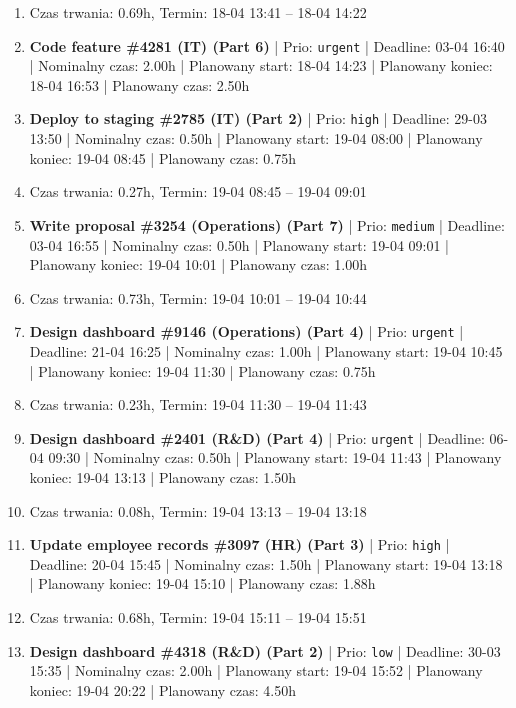 {\begin{enumerate}
  \item [\textbf{PRZERWA}] Czas trwania: 0.69h, Termin: 18-04 13:41 -- 18-04 14:22
  \item [\textbf{14604}] \textbf{Code feature \#4281 (IT) (Part 6)} | Prio: \texttt{urgent} | Deadline: 03-04 16:40 | Nominalny czas: 2.00h | Planowany start: 18-04 14:23 | Planowany koniec: 18-04 16:53 | Planowany czas: 2.50h
  \item [\textbf{14623}] \textbf{Deploy to staging \#2785 (IT) (Part 2)} | Prio: \texttt{high} | Deadline: 29-03 13:50 | Nominalny czas: 0.50h | Planowany start: 19-04 08:00 | Planowany koniec: 19-04 08:45 | Planowany czas: 0.75h
  \item [\textbf{PRZERWA}] Czas trwania: 0.27h, Termin: 19-04 08:45 -- 19-04 09:01
  \item [\textbf{14663}] \textbf{Write proposal \#3254 (Operations) (Part 7)} | Prio: \texttt{medium} | Deadline: 03-04 16:55 | Nominalny czas: 0.50h | Planowany start: 19-04 09:01 | Planowany koniec: 19-04 10:01 | Planowany czas: 1.00h
  \item [\textbf{PRZERWA}] Czas trwania: 0.73h, Termin: 19-04 10:01 -- 19-04 10:44
  \item [\textbf{14606}] \textbf{Design dashboard \#9146 (Operations) (Part 4)} | Prio: \texttt{urgent} | Deadline: 21-04 16:25 | Nominalny czas: 1.00h | Planowany start: 19-04 10:45 | Planowany koniec: 19-04 11:30 | Planowany czas: 0.75h
  \item [\textbf{PRZERWA}] Czas trwania: 0.23h, Termin: 19-04 11:30 -- 19-04 11:43
  \item [\textbf{14603}] \textbf{Design dashboard \#2401 (R\&D) (Part 4)} | Prio: \texttt{urgent} | Deadline: 06-04 09:30 | Nominalny czas: 0.50h | Planowany start: 19-04 11:43 | Planowany koniec: 19-04 13:13 | Planowany czas: 1.50h
  \item [\textbf{PRZERWA}] Czas trwania: 0.08h, Termin: 19-04 13:13 -- 19-04 13:18
  \item [\textbf{14621}] \textbf{Update employee records \#3097 (HR) (Part 3)} | Prio: \texttt{high} | Deadline: 20-04 15:45 | Nominalny czas: 1.50h | Planowany start: 19-04 13:18 | Planowany koniec: 19-04 15:10 | Planowany czas: 1.88h
  \item [\textbf{PRZERWA}] Czas trwania: 0.68h, Termin: 19-04 15:11 -- 19-04 15:51
  \item [\textbf{14691}] \textbf{Design dashboard \#4318 (R\&D) (Part 2)} | Prio: \texttt{low} | Deadline: 30-03 15:35 | Nominalny czas: 2.00h | Planowany start: 19-04 15:52 | Planowany koniec: 19-04 20:22 | Planowany czas: 4.50h

\end{enumerate}}
